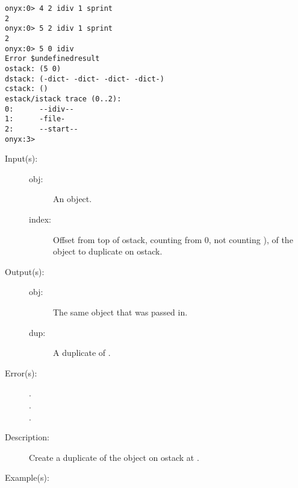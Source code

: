 \begin{description}
\begin{description}
\begin{verbatim}
onyx:0> 4 2 idiv 1 sprint
2
onyx:0> 5 2 idiv 1 sprint
2
onyx:0> 5 0 idiv
Error $undefinedresult
ostack: (5 0)
dstack: (-dict- -dict- -dict- -dict-)
cstack: ()
estack/istack trace (0..2):
0:      --idiv--
1:      -file-
2:      --start--
onyx:3>
		\end{verbatim}
	\end{description}
\label{systemdict:idup}
\item[{\onyxop{obj \dots index}{idup}{obj \dots dup}}: ]
	\begin{description}\item[]
	\item[Input(s): ]
		\begin{description}\item[]
		\item[obj: ]
			An object.
		\item[index: ]
			Offset from top of ostack, counting from 0, not counting
			), of the object to duplicate on ostack.
		\end{description}
	\item[Output(s): ]
		\begin{description}\item[]
		\item[obj: ]
			The same object that was passed in.
		\item[dup: ]
			A duplicate of .
		\end{description}
	\item[Error(s): ]
		\begin{description}\item[]
		\item[.]
		\item[.]
		\item[.]
		\end{description}
	\item[Description: ]
		Create a duplicate of the object on ostack at .
	\item[Example(s): ]\begin{verbatim}


\end{verbatim}
\end{description}
\end{description}
